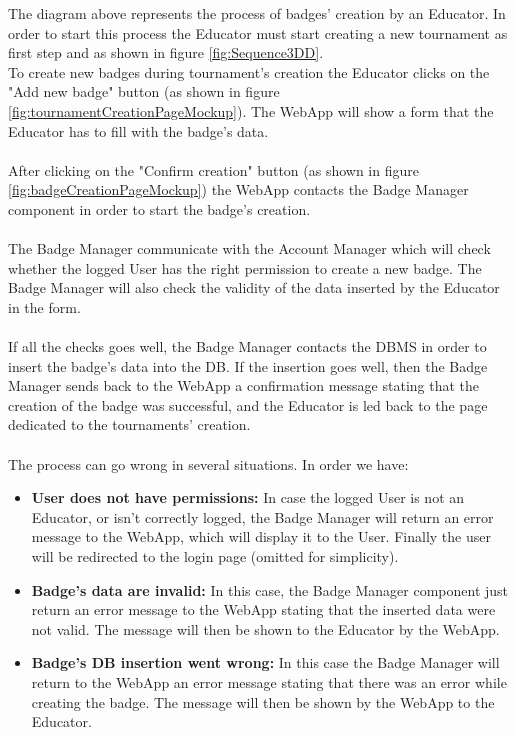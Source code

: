 \documentclass{article}
\begin{document}
{        The diagram above represents the process of badges' creation by an Educator.
        In order to start this process the Educator must start creating a new tournament as first
        step and as shown in figure \ref{fig:Sequence3DD}. \\
        To create new badges during tournament's creation the Educator clicks on the 
        "Add new badge" button (as shown in figure \ref{fig:tournamentCreationPageMockup}). 
        The WebApp will show a form that the Educator has to fill with the badge's data. 
        \\ \\
        After clicking on the "Confirm creation" button (as shown in figure \ref{fig:badgeCreationPageMockup})
        the WebApp contacts the Badge Manager component in order to start the badge's creation.
        \\ \\
        The Badge Manager communicate with the Account Manager which will check whether the 
        logged User has the right permission to create a new badge. The Badge Manager will also
        check the validity of the data inserted by the Educator in the form.
        \\ \\
        If all the checks goes well, the Badge Manager contacts the DBMS in order to insert the
        badge's data into the DB.
        If the insertion goes well, then the Badge Manager sends back to the WebApp a confirmation
        message stating that the creation of the badge was successful, and the Educator is led back
        to the page dedicated to the tournaments' creation.
        \\ \\
        The process can go wrong in several situations. In order we have:
        \begin{itemize}
            \item \textbf{User does not have permissions:} In case the logged User is not an
            Educator, or isn't correctly logged, the Badge Manager will return an
            error message to the WebApp, which will display it to the User.
            Finally the user will be redirected to the login page (omitted for simplicity).
            \item \textbf{Badge's data are invalid:} In this case, the Badge Manager component 
            just return an error message to the WebApp stating that the inserted data were not 
            valid. The message will then be shown to the Educator by the WebApp.
            \item \textbf{Badge's DB insertion went wrong:} In this case the Badge Manager will 
            return to the WebApp an error message stating that there was an error while creating 
            the badge. The message will then be shown by the WebApp to the Educator.
        \end{itemize}

}
\end{document}

